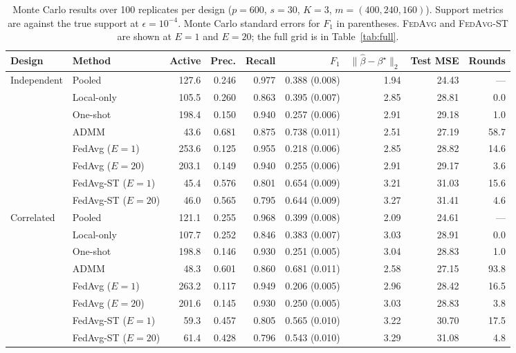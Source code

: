 \begin{table}[t]
\centering
\small
\caption{Monte Carlo results over 100 replicates per design ($p=600$, $s=30$, $K=3$, $m=(400,240,160)$). Support metrics are against the true support at $\epsilon=10^{-4}$. Monte Carlo standard errors for $F_1$ in parentheses. \textsc{FedAvg} and \textsc{FedAvg-ST} are shown at $E=1$ and $E=20$; the full grid is in Table~\ref{tab:full}.}
\label{tab:main}
\begin{tabular}{llrrrrrrr}
\toprule
Design & Method & Active & Prec. & Recall & $F_1$ & $\|\hat\beta-\beta^\star\|_2$ & Test MSE & Rounds \\
\midrule
Independent & Pooled & 127.6 & 0.246 & 0.977 & 0.388 (0.008) & 1.94 & 24.43 & --- \\
 & Local-only & 105.5 & 0.260 & 0.863 & 0.395 (0.007) & 2.85 & 28.81 & 0.0 \\
 & One-shot & 198.4 & 0.150 & 0.940 & 0.257 (0.006) & 2.91 & 29.18 & 1.0 \\
 & ADMM & 43.6 & 0.681 & 0.875 & 0.738 (0.011) & 2.51 & 27.19 & 58.7 \\
 & FedAvg ($E=1$) & 253.6 & 0.125 & 0.955 & 0.218 (0.006) & 2.85 & 28.82 & 14.6 \\
 & FedAvg ($E=20$) & 203.1 & 0.149 & 0.940 & 0.255 (0.006) & 2.91 & 29.17 & 3.6 \\
 & FedAvg-ST ($E=1$) & 45.4 & 0.576 & 0.801 & 0.654 (0.009) & 3.21 & 31.03 & 15.6 \\
 & FedAvg-ST ($E=20$) & 46.0 & 0.565 & 0.795 & 0.644 (0.009) & 3.27 & 31.41 & 4.6 \\
\midrule
Correlated & Pooled & 121.1 & 0.255 & 0.968 & 0.399 (0.008) & 2.09 & 24.61 & --- \\
 & Local-only & 107.7 & 0.252 & 0.846 & 0.383 (0.007) & 3.03 & 28.91 & 0.0 \\
 & One-shot & 198.8 & 0.146 & 0.930 & 0.251 (0.005) & 3.04 & 28.83 & 1.0 \\
 & ADMM & 48.3 & 0.601 & 0.860 & 0.681 (0.011) & 2.58 & 27.15 & 93.8 \\
 & FedAvg ($E=1$) & 263.2 & 0.117 & 0.949 & 0.206 (0.005) & 2.96 & 28.42 & 16.5 \\
 & FedAvg ($E=20$) & 201.6 & 0.145 & 0.930 & 0.250 (0.005) & 3.03 & 28.83 & 3.8 \\
 & FedAvg-ST ($E=1$) & 59.3 & 0.457 & 0.805 & 0.565 (0.010) & 3.22 & 30.70 & 17.5 \\
 & FedAvg-ST ($E=20$) & 61.4 & 0.428 & 0.796 & 0.543 (0.010) & 3.29 & 31.08 & 4.8 \\

\end{tabular}
\end{table}
